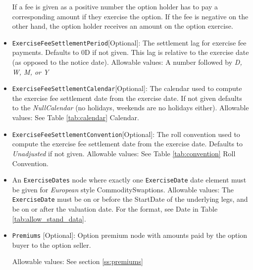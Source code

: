 \begin{itemize}
  If a fee is given as a positive number the option holder has to pay a corresponding amount if they exercise the
  option. If the fee is negative on the other hand, the option holder receives an amount on the option exercise.

\item \lstinline!ExerciseFeeSettlementPeriod![Optional]: The settlement lag for exercise fee payments. Defaults to 0D if not
  given. This lag is relative to the exercise date (as opposed to the notice date). Allowable values: A number followed by \emph{D, W, M, or Y}

\item \lstinline!ExerciseFeeSettlementCalendar![Optional]: The calendar used to compute the exercise fee settlement date from the
  exercise date. If not given defaults to the \emph{NullCalendar} (no holidays, weekends are no holidays either). Allowable values: See Table \ref{tab:calendar} Calendar.

\item \lstinline!ExerciseFeeSettlementConvention![Optional]: The roll convention used to compute the exercise fee settlement date from
  the exercise date. Defaults to \emph{Unadjusted} if not given. Allowable values: See Table \ref{tab:convention} Roll Convention.

\item An \lstinline!ExerciseDates! node where exactly one \lstinline!ExerciseDate! date element must be given for \emph{European} style CommoditySwaptions. Allowable values: The \lstinline!ExerciseDate! must be on or before the StartDate of the underlying legs, and be on or after the valuation date. For the format, see Date in Table \ref{tab:allow_stand_data}. \\

\item \lstinline!Premiums! [Optional]: Option premium node with amounts paid by the option buyer to the option seller.

Allowable values:  See section \ref{ss:premiums}

\end{itemize}



